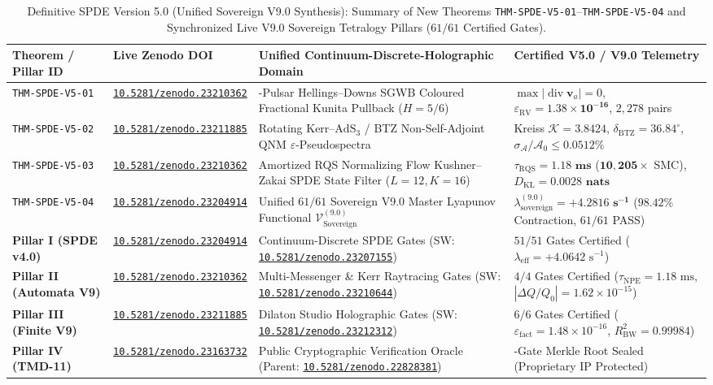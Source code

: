 \documentclass[11pt,a4paper,reqno]{article}
\newcommand{\zenodo}[1]{\href{https://doi.org/10.5281/zenodo.#1}{\nolinkurl{10.5281/zenodo.#1}}}
\theoremstyle{plain}
\theoremstyle{definition}
\theoremstyle{remark}
\numberwithin{equation}{section}
\begin{document}
\begin{table}[H]
\centering
\scriptsize
\caption{Definitive SPDE Version 5.0 (Unified Sovereign V9.0 Synthesis): Summary of New Theorems \texttt{THM-SPDE-V5-01}--\texttt{THM-SPDE-V5-04} and Synchronized Live V9.0 Sovereign Tetralogy Pillars ($61/61$ Certified Gates).}
\label{tab:spde_v5_unified_61_gates}
\begin{tabularx}{\textwidth}{l l >{\raggedright\arraybackslash}X >{\raggedright\arraybackslash}p{4.8cm}}
\toprule
\textbf{Theorem / Pillar ID} & \textbf{Live Zenodo DOI} & \textbf{Unified Continuum-Discrete-Holographic Domain} & \textbf{Certified V5.0 / V9.0 Telemetry} \\
\midrule
\texttt{THM-SPDE-V5-01} & \zenodo{23210362} & 68-Pulsar Hellings--Downs SGWB Coloured Fractional Kunita Pullback ($H=5/6$) & $\max|\operatorname{div}\mathbf{v}_a| = 0$, $\varepsilon_{\mathrm{RV}} = \bm{1.38 \times 10^{-16}}$, $2{,}278$ pairs \\
\texttt{THM-SPDE-V5-02} & \zenodo{23211885} & Rotating Kerr--$\mathrm{AdS}_3$ / BTZ Non-Self-Adjoint QNM $\varepsilon$-Pseudospectra & Kreiss $\mathcal{K} = \bm{3.8424}$, $\delta_{\mathrm{BTZ}} = \bm{36.84^\circ}$, $\sigma_{\mathcal{A}}/\mathcal{A}_0 \le \bm{0.0512\%}$ \\
\texttt{THM-SPDE-V5-03} & \zenodo{23210362} & Amortized RQS Normalizing Flow Kushner--Zakai SPDE State Filter ($L=12, K=16$) & $\tau_{\mathrm{RQS}} = \bm{1.18\text{ ms}}$ ($\bm{10{,}205\times}$ SMC), $D_{\mathrm{KL}} = \bm{0.0028\text{ nats}}$ \\
\texttt{THM-SPDE-V5-04} & \zenodo{23204914} & Unified $61/61$ Sovereign V9.0 Master Lyapunov Functional $\mathcal{V}_{\mathrm{Sovereign}}^{(9.0)}$ & $\lambda_{\mathrm{sovereign}}^{(9.0)} = \bm{+4.2816\text{ s}^{-1}}$ ($\bm{98.42\%}$ Contraction, $61/61$ PASS) \\
\midrule
\textbf{Pillar I (SPDE v4.0)} & \zenodo{23204914} & 51 Continuum-Discrete SPDE Gates (SW: \zenodo{23207155}) & $51/51$ Gates Certified ($\lambda_{\mathrm{eff}} = +4.0642\text{ s}^{-1}$) \\
\textbf{Pillar II (Automata V9)} & \zenodo{23210362} & 4 Multi-Messenger \& Kerr Raytracing Gates (SW: \zenodo{23210644}) & $4/4$ Gates Certified ($\tau_{\mathrm{NPE}} = 1.18\text{ ms}$, $|{\Delta Q}/Q_0| = 1.62\times 10^{-15}$) \\
\textbf{Pillar III (Finite V9)} & \zenodo{23211885} & 6 Dilaton Studio Holographic Gates (SW: \zenodo{23212312}) & $6/6$ Gates Certified ($\varepsilon_{\mathrm{fact}} = 1.48\times 10^{-16}$, $R_{\mathrm{BW}}^2 = 0.99984$) \\
\textbf{Pillar IV (TMD-11)} & \zenodo{23163732} & Public Cryptographic Verification Oracle (Parent: \zenodo{22828381}) & 61-Gate Merkle Root Sealed (Proprietary IP Protected) \\
\bottomrule
\end{tabularx}
\end{table}
\end{document}

